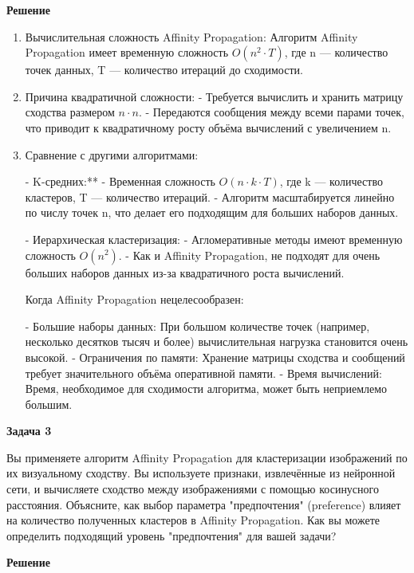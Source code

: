 \textbf{Решение}
\begin{enumerate}
    \item Вычислительная сложность Affinity Propagation: Алгоритм Affinity Propagation имеет временную сложность $O(n^2 \cdot T)$, где n — количество точек данных, T — количество итераций до сходимости.
          
    \item Причина квадратичной сложности:
          - Требуется вычислить и хранить матрицу сходства размером $n \cdot n$.
          - Передаются сообщения между всеми парами точек, что приводит к квадратичному росту объёма вычислений с увеличением n.
          
    \item Сравнение с другими алгоритмами:
          
          - K-средних:**
          - Временная сложность $O(n \cdot k \cdot T)$, где k — количество кластеров, T — количество итераций.
          - Алгоритм масштабируется линейно по числу точек n, что делает его подходящим для больших наборов данных.
          
          - Иерархическая кластеризация:
          - Агломеративные методы имеют временную сложность $O(n^2)$.
          - Как и Affinity Propagation, не подходят для очень больших наборов данных из-за
          квадратичного роста вычислений.
          
          Когда Affinity Propagation нецелесообразен:
          
          - Большие наборы данных: При большом количестве точек (например, несколько десятков тысяч и более) вычислительная нагрузка становится очень высокой.
          - Ограничения по памяти: Хранение матрицы сходства и сообщений требует значительного объёма оперативной памяти.
          - Время вычислений: Время, необходимое для сходимости алгоритма, может быть неприемлемо большим.
\end{enumerate}


\textbf{Задача 3}

Вы применяете алгоритм Affinity Propagation для кластеризации изображений по их визуальному сходству. Вы используете признаки, извлечённые из нейронной сети, и вычисляете сходство между изображениями с помощью косинусного расстояния.
Объясните, как выбор параметра "предпочтения" (preference) влияет на количество полученных кластеров в Affinity Propagation. Как вы можете определить подходящий уровень "предпочтения" для вашей задачи?

\textbf{Решение}

